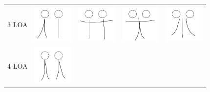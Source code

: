 \begin{table}[!htb]
\begin{tabular}{ | c | c || c | c | c | }
\begin{minipage}{.15\textwidth}
    \end{minipage} & 
    \\ \hline
    3 LOA 
    &
    \begin{minipage}{.15\textwidth}
      \includegraphics[width=\linewidth, height=20mm]{img/3loa_separate_keyframe}
    \end{minipage}
    &
    \begin{minipage}{.15\textwidth}
      \includegraphics[width=\linewidth, height=20mm]{img/04keyframe}
    \end{minipage}
    &
    \begin{minipage}{.15\textwidth}
      \includegraphics[width=\linewidth, height=20mm]{img/05keyframe}
    \end{minipage} 
    & 
    \begin{minipage}{.15\textwidth}
      \includegraphics[width=\linewidth, height=20mm]{img/06keyframe}
    \end{minipage} 
    \\ \hline
    4 LOA 
    &
    \begin{minipage}{.15\textwidth}
      \includegraphics[width=\linewidth, height=20mm]{img/4loa_separate_keyframe}
    \end{minipage}
    &
    \begin{minipage}{.15\textwidth}

\end{minipage}
\end{tabular}
\end{table}
